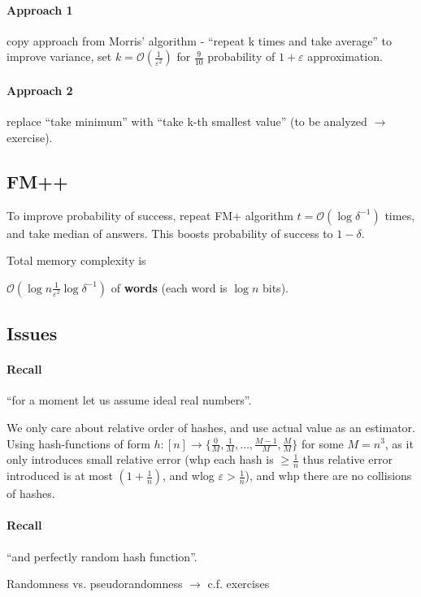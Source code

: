 \documentclass[11pt]{article}
\newcommand{\bigo}{\mathcal{O}}
\begin{document}
\paragraph{Approach 1} copy approach from Morris’ algorithm - ``repeat k times and take average''
to improve variance, set $k = \bigo(\frac{1}{\varepsilon^2})$ for $\frac{9}{10}$ probability of $1+ \varepsilon$ approximation.

\paragraph{Approach 2} replace ``take minimum'' with ``take k-th smallest value''
(to be analyzed $\rightarrow$ exercise).

\subsection{FM++}
To improve probability of success, repeat FM+ algorithm $t = \bigo(\log \delta^{-1})$ times, and take median of answers. This boosts probability of success to $1-\delta$.

Total memory complexity is

$\bigo(\log n  \frac{1}{\varepsilon^2} \log \delta^{-1})$ of \textbf{words} (each word is $\log n$ bits).

\subsection{Issues}

\paragraph{Recall} ``for a moment let us assume ideal real numbers''.

We only care about relative order of hashes, and use actual value as an estimator. Using hash-functions of form $h: [n] \rightarrow \{\frac{0}{M}, \frac{1}{M}, \dots, \frac{M-1}{M}, \frac{M}{M}\}$ for some $M = n^3$, as it only introduces small relative error (whp each hash is $\geq \frac{1}{n}$ thus relative error introduced is at most $(1+\frac{1}{n})$, and wlog $\varepsilon>\frac{1}{n}$), and whp there are no collisions of hashes.

\paragraph{Recall} ``and perfectly random hash function''.

Randomness vs. pseudorandomness $\rightarrow$ c.f. exercises
\end{document}
